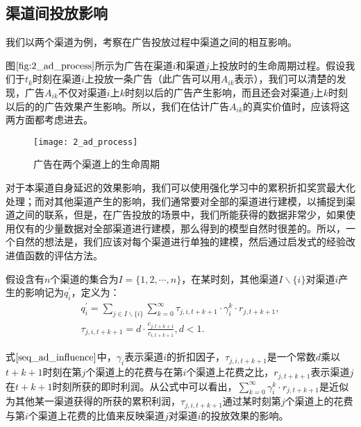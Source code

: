 \subsection{渠道间投放影响}
我们以两个渠道为例，考察在广告投放过程中渠道之间的相互影响。

图$\ref{fig:2_ad_process}$所示为广告在渠道$i$和渠道$j$上投放时的生命周期过程。假设我们于$t_{k}$时刻在渠道$i$上投放一条广告（此广告可以用$A_{ik}$表示），我们可以清楚的发现，广告$A_{ik}$不仅对渠道$i$上$k$时刻以后的广告产生影响，而且还会对渠道$j$上$k$时刻以后的的广告效果产生影响。所以，我们在估计广告$A_{ik}$的真实价值时，应该将这两方面都考虑进去。
\begin{figure}[htbp]
\centering
\texttt{[image: 2\_ad\_process]}
\caption{广告在两个渠道上的生命周期}
\label{fig:2_ad_process}
\end{figure}

对于本渠道自身延迟的效果影响，我们可以使用强化学习中的累积折扣奖赏最大化处理；而对其他渠道产生的影响，我们通常要对全部的渠道进行建模，以捕捉到渠道之间的联系，但是，在广告投放的场景中，我们所能获得的数据非常少，如果使用仅有的少量数据对全部渠道进行建模，那么得到的模型自然时很差的。所以，一个自然的想法是，我们应该对每个渠道进行单独的建模，然后通过启发式的经验改进值函数的评估方法。

假设含有$n$个渠道的集合为$I=\{1,2,\cdots,n\}$，在某时刻，其他渠道$I\backslash\{i\}$对渠道$i$产生的影响记为$q_{i}^{'}$，定义为：
\begin{equation}\label{seq_ad_influence}
\begin{aligned}
q_{i}^{'}=\sum_{j\in I \backslash \{i\}} \sum_{k=0}^{\infty} \tau_{j,i,t+k+1} \cdot \gamma_{i}^{k} \cdot r_{j,t+k+1},\\
\tau_{j,i,t+k+1}=d \cdot \frac{c_{j,t+k+1}}{c_{i,t+k+1}},d<1.
\end{aligned}
\end{equation}

式$\eqref{seq_ad_influence}$中，$\gamma_{i}$表示渠道$i$的折扣因子，$\tau_{j,i,t+k+1}$是一个常数$d$乘以$t+k+1$时刻在第$j$个渠道上的花费与在第$i$个渠道上花费之比，$r_{j,t+k+1}$表示渠道$j$在$t+k+1$时刻所获的即时利润。从公式中可以看出，$\sum_{k=0}^{\infty} \gamma_{i}^{k} \cdot r_{j,t+k+1}$是近似为其他某一渠道获得的所获的累积利润，$\tau_{j,i,t+k+1}$通过某时刻第$j$个渠道上的花费与第$i$个渠道上花费的比值来反映渠道$j$对渠道$i$的投放效果的影响。

